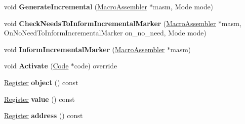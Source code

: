 \begin{DoxyCompactItemize}
\item 
void {\bfseries Generate\+Incremental} (\hyperlink{classv8_1_1internal_1_1_macro_assembler}{Macro\+Assembler} $\ast$masm, Mode mode)\hypertarget{classv8_1_1internal_1_1_record_write_stub_a05cf08ed0350334ba02a2e918b42ffcc}{}\label{classv8_1_1internal_1_1_record_write_stub_a05cf08ed0350334ba02a2e918b42ffcc}

\item 
void {\bfseries Check\+Needs\+To\+Inform\+Incremental\+Marker} (\hyperlink{classv8_1_1internal_1_1_macro_assembler}{Macro\+Assembler} $\ast$masm, On\+No\+Need\+To\+Inform\+Incremental\+Marker on\+\_\+no\+\_\+need, Mode mode)\hypertarget{classv8_1_1internal_1_1_record_write_stub_aa80cd82bd6fa0cdc17b5cb2d17540d59}{}\label{classv8_1_1internal_1_1_record_write_stub_aa80cd82bd6fa0cdc17b5cb2d17540d59}

\item 
void {\bfseries Inform\+Incremental\+Marker} (\hyperlink{classv8_1_1internal_1_1_macro_assembler}{Macro\+Assembler} $\ast$masm)\hypertarget{classv8_1_1internal_1_1_record_write_stub_a18e17a353df1617947581e3e6b9e9183}{}\label{classv8_1_1internal_1_1_record_write_stub_a18e17a353df1617947581e3e6b9e9183}

\item 
void {\bfseries Activate} (\hyperlink{classv8_1_1internal_1_1_code}{Code} $\ast$code) override\hypertarget{classv8_1_1internal_1_1_record_write_stub_aee832e64590d152a601ed41c5e4fdac9}{}\label{classv8_1_1internal_1_1_record_write_stub_aee832e64590d152a601ed41c5e4fdac9}

\item 
\hyperlink{structv8_1_1internal_1_1_register}{Register} {\bfseries object} () const \hypertarget{classv8_1_1internal_1_1_record_write_stub_a6d3a7affc9526b332c46fbe8f54f0b19}{}\label{classv8_1_1internal_1_1_record_write_stub_a6d3a7affc9526b332c46fbe8f54f0b19}

\item 
\hyperlink{structv8_1_1internal_1_1_register}{Register} {\bfseries value} () const \hypertarget{classv8_1_1internal_1_1_record_write_stub_a7c90bc874fcf5f031f8b923b09dee7ad}{}\label{classv8_1_1internal_1_1_record_write_stub_a7c90bc874fcf5f031f8b923b09dee7ad}

\item 
\hyperlink{structv8_1_1internal_1_1_register}{Register} {\bfseries address} () const \hypertarget{classv8_1_1internal_1_1_record_write_stub_a3735e76e5fcb078fcd9f08c519c94d8c}{}\label{classv8_1_1internal_1_1_record_write_stub_a3735e76e5fcb078fcd9f08c519c94d8c}


\end{DoxyCompactItemize}
